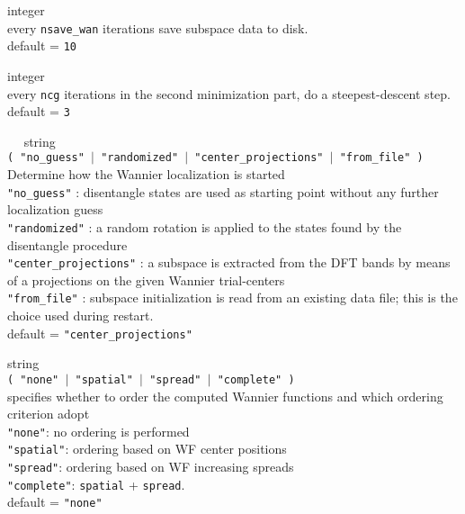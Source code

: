 {\noindent{}%
{\sc integer} \\ every {\tt nsave\_wan} iterations save subspace data to disk.\\ 
{\sc default} = {\tt 10 }\par

\noindent{}%
{\sc integer} \\ every {\tt ncg} iterations in the second minimization part, 
do a steepest-descent step.\\ {\sc default} = {\tt 3 }\par

\noindent{}%
{\sc $\quad$ string} \\  
{\tt ( "no\_guess" $\mid$ "randomized" $\mid$ "center\_projections" 
$\mid$ "from\_file" )}\\
 Determine how the Wannier localization is started\\
{\tt "no\_guess"} : disentangle states are used as starting point
                 without any further localization guess\\
{\tt "randomized"} : a random rotation is applied to the states found by
                 the disentangle procedure\\
{\tt "center\_projections"} : a subspace is extracted from the DFT bands
                 by means of a projections on the given Wannier trial-centers \\
{\tt "from\_file"} : subspace initialization is read from an existing data file;
                 this is the choice used during restart. \\
{\sc default} = {\tt "center\_projections"} \par

\noindent{}%
{\sc string} \\ {\tt ( "none" $\mid$ "spatial" $\mid$ "spread" $\mid$ "complete" ) } \\
specifies whether to order the computed Wannier functions and
              which ordering criterion adopt\\
{\tt "none"}:      no ordering is performed\\
{\tt "spatial"}:   ordering based on WF center positions\\
{\tt "spread"}:    ordering based on WF increasing spreads\\
{\tt "complete"}:  {\tt spatial} + {\tt spread}. \\
{\sc default} = {\tt "none" }\par

}

